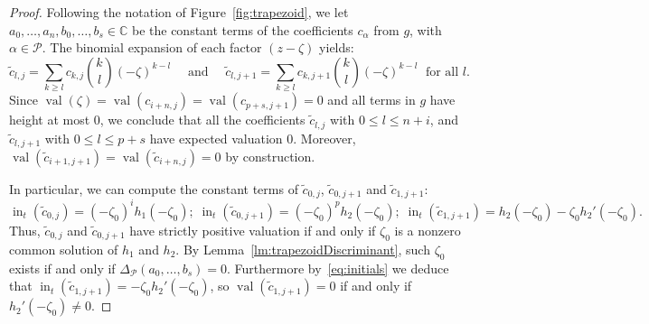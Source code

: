 \documentclass[11pt]{amsart}
\numberwithin{equation}{section}
\theoremstyle{plain}
\theoremstyle{definition}
\theoremstyle{remark}
\begin{document}
\begin{proof}
  Following the notation of Figure~\ref{fig:trapezoid}, we let $a_0,
  \ldots, a_n,b_0,\ldots,b_s \in {\mathbb{C}}$ be the constant terms of the
  coefficients $c_{\alpha}$ from $g$, with $\alpha\in {\mathcal{P}}$.  The
  binomial expansion of each factor $(z-{\zeta})$ yields:
\begin{equation}
  \tilde{c}_{l,j}=\sum_{k\geq l} c_{k,j} \binom{k}{l}(-{\zeta})^{k-l} \quad\text{ and }\quad
  \tilde{c}_{l,j+1}=\sum_{k\geq l} c_{k,j+1} \binom{k}{l}(-{\zeta})^{k-l} \; \text{ for all }l.\label{eq:expValFeeding}
\end{equation}
Since $\operatorname{val}({\zeta})= \operatorname{val}(c_{i+n,j})=\operatorname{val}(c_{p+s,j+1})=0$ and all terms
in $g$ have height at most 0, we conclude that all the coefficients
$\tilde{c}_{l,j}$ with $0\leq l\leq n+i$, and $\tilde{c}_{l,j+1}$ with
$0\leq l\leq p+s$ have expected valuation 0. Moreover,
$\operatorname{val}(\tilde{c}_{i+1,j+1})=\operatorname{val}(\tilde{c}_{i+n,j})=0$ by construction.

In particular, we  can compute the constant terms of $\tilde{c}_{0,j}$, $\tilde{c}_{0,j+1}$ and $\tilde{c}_{1,j+1}$:
\begin{equation}
    \operatorname{in}_t(\tilde{c}_{0,j})\!=\! (-{\zeta}_0)^ih_1(-{\zeta}_0);\; 
    \operatorname{in}_t(\tilde{c}_{0,j+1})\!=\!(-{\zeta}_0)^p h_2(-{\zeta}_0);\;
    \operatorname{in}_t(\tilde{c}_{1,j+1})\!=\!h_2(-{\zeta}_0) -{\zeta}_0 h_2'(-{\zeta}_0).
\label{eq:initials}
\end{equation}
Thus, $\tilde{c}_{0,j}$ and $\tilde{c}_{0,j+1}$ have strictly positive
valuation if and only if ${\zeta}_0$ is a nonzero common solution of $h_1$
and $h_2$. By Lemma~\ref{lm:trapezoidDiscriminant}, such ${\zeta}_0$
exists if and only if $\Delta_{\mathcal{P}}(a_0,\ldots, b_s)=0$. 
Furthermore by~\eqref{eq:initials} we deduce that $\operatorname{in}_t(\tilde{c}_{1,j+1})=-{\zeta}_0h_2'(-{\zeta}_0)$,  so $\operatorname{val}(\tilde{c}_{1,j+1})=0$ if and only if $h_2'(-{\zeta}_0)\neq 0$.
\end{proof}
\end{document}
